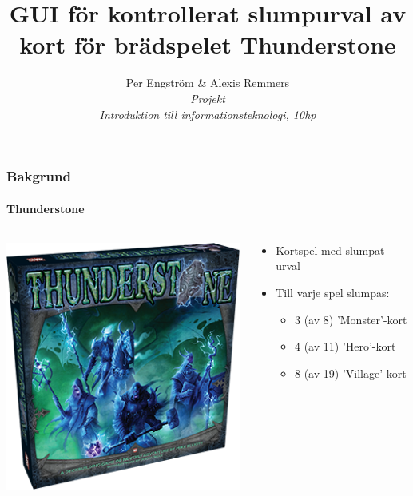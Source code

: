 \documentclass{beamer}
\title[Thundersone urval]{GUI för kontrollerat slumpurval av kort för brädspelet Thunderstone}
\author[P. Engström, A. Remmers]{Per Engström \& Alexis Remmers \\[0.5cm] 
\normalsize \emph{Projekt} \\
\normalsize \emph{Introduktion till informationsteknologi, 10hp}}
\begin{document}
\begin{frame}[plain]
	\centering
	\titlepage
\end{frame}

\begin{frame}
\frametitle{Bakgrund}
\framesubtitle{Thunderstone}

\begin{columns}%
    \begin{column}{.5\textwidth}
        \centering
        \includegraphics[width=\textwidth]{thunderstone-3dbox.png}
    \end{column}
    \begin{column}{.5\textwidth}
        \begin{itemize}
            \item Kortspel med slumpat urval
            \pause
            \item Till varje spel slumpas:
            \begin{itemize}
                \item 3 (av 8) 'Monster'-kort
                \item 4 (av 11) 'Hero'-kort
                \item 8 (av 19) 'Village'-kort
            \end{itemize}
        \end{itemize}
    \end{column}
\end{columns}

\end{frame}
\end{document}
